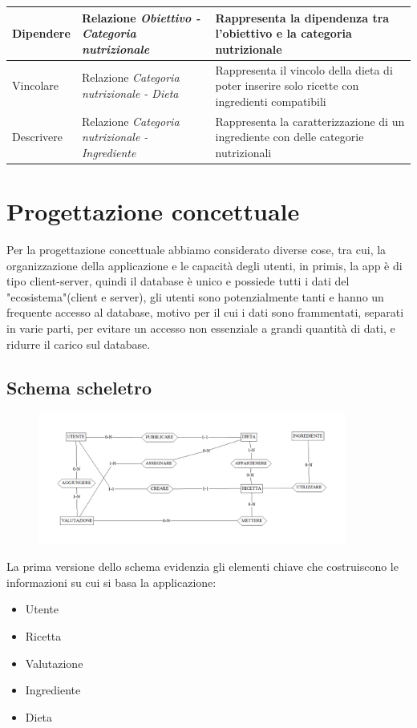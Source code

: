 ﻿\documentclass[a4paper,12pt]{report}
\begin{document}
\begin{table}[h!]
\begin{tabular}{ |p{0.7in}|p{1.9in}|p{2.4in}| }
        \hline
        \scriptsize{Dipendere} & \scriptsize{Relazione \newline \textit{Obiettivo - Categoria nutrizionale}} & \scriptsize{Rappresenta la dipendenza tra l'obiettivo e la categoria nutrizionale} \\
        \hline
        \scriptsize{Vincolare} & \scriptsize{Relazione \newline \textit{Categoria nutrizionale - Dieta}} & \scriptsize{Rappresenta il vincolo della dieta di poter inserire solo ricette con ingredienti compatibili} \\
        \hline
        \scriptsize{Descrivere} & \scriptsize{Relazione \newline \textit{Categoria nutrizionale - Ingrediente}} & \scriptsize{Rappresenta la caratterizzazione di un ingrediente con delle categorie nutrizionali} \\
        \hline
    \end{tabular}
\end{table}

\chapter{Progettazione concettuale}
Per la progettazione concettuale abbiamo considerato diverse cose,
tra cui, la organizzazione della applicazione e le capacità degli utenti,
in primis, la app è di tipo client-server, quindi il database è unico e
possiede tutti i dati del "ecosistema"(client e server), gli utenti sono potenzialmente tanti
e hanno un frequente accesso al database, motivo per il cui i dati sono
frammentati, separati in varie parti, per evitare un accesso non essenziale a grandi quantità di dati, e ridurre il carico sul database.    
\section{Schema scheletro}
\begin{figure}[H]
    \centering
   \includegraphics[width=0.9\textwidth]{app_images/schema-scheletro.png}  
    \label{fig:example}
\end{figure}
La prima versione dello schema evidenzia gli elementi chiave 
che costruiscono le informazioni su cui si basa la applicazione:
\begin{itemize}
    \item Utente
    \item Ricetta
    \item Valutazione
    \item Ingrediente
    \item Dieta
\end{itemize}
\end{document}
